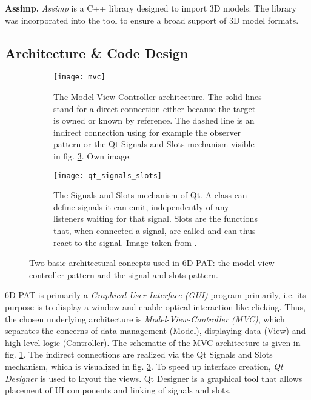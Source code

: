 \noindent\textbf{Assimp.} \textit{Assimp} \cite{assimp} is a C++ library designed to import 3D models. The library was incorporated into the tool to ensure a broad support of 3D model formats.

\subsection{Architecture \& Code Design}

\begin{figure}[!tbp]
	\centering
	\begin{subfigure}[t]{0.47\textwidth}
		\centering
    	\texttt{[image: mvc]}
    	\caption{The Model-View-Controller architecture. The solid lines stand for a direct connection either because the target is owned or known by reference. The dashed line is an indirect connection using for example the observer pattern or the Qt Signals and Slots mechanism visible in fig. \ref{fig:qt_signals_slots}. Own image.}
    	\label{fig:mvc}
	\end{subfigure}
	\hfill
	\begin{subfigure}[t]{0.47\textwidth}
	\centering
    	\texttt{[image: qt\_signals\_slots]}
    	\caption{The Signals and Slots mechanism of Qt. A class can define signals it can emit, independently of any listeners waiting for that signal. Slots are the functions that, when connected a signal, are called and can thus react to the signal. Image taken from \cite{qt_signals_and_slots}.}
    	\label{fig:qt_signals_slots}
	\end{subfigure}
	\caption{Two basic architectural concepts used in 6D-PAT: the model view controller pattern and the signal and slots pattern.}
\end{figure} 

6D-PAT is primarily a \textit{Graphical User Interface (GUI)} program primarily, i.e. its purpose is to display a window and enable optical interaction like clicking. Thus, the chosen underlying architecture is \textit{Model-View-Controller (MVC)}, which separates the concerns of data management (Model), displaying data (View) and high level logic (Controller). The schematic of the MVC architecture is given in fig. \ref{fig:mvc}. The indirect connections are realized via the Qt Signals and Slots mechanism, which is visualized in fig. \ref{fig:qt_signals_slots}. To speed up interface creation, \textit{Qt Designer} is used to layout the views. Qt Designer is a graphical tool that allows placement of UI components and linking of signals and slots. \\

